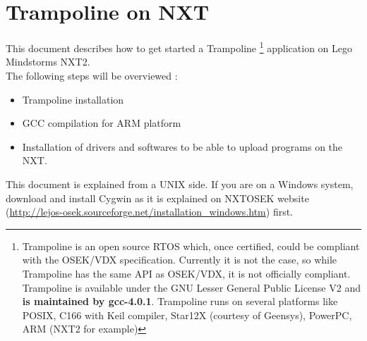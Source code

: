 


%
%



\chapter{Trampoline on NXT}

This document describes how to get started a Trampoline \footnote{Trampoline is an open source RTOS which, once certified, could be compliant with the OSEK/VDX specification. Currently it is not the case, so while Trampoline has the same API as OSEK/VDX, it is not officially compliant. Trampoline is available under the GNU Lesser General Public License V2 and \textbf{is maintained by gcc-4.0.1}. Trampoline runs on several platforms like POSIX, C166 with Keil compiler, Star12X (courtesy of Geensys), PowerPC, ARM (NXT2 for example)} application on Lego Mindstorms NXT2.\\
The following steps will be overviewed :
\begin{itemize}
\item Trampoline installation
\item GCC compilation for ARM platform
\item Installation of drivers and softwares to be able to upload programs on the NXT.
\end{itemize}
This document is explained from a UNIX side. If you are on a Windows system, download and install Cygwin as it is explained on NXTOSEK website (\href{http://lejos-osek.sourceforge.net/installation_windows.htm}{http://lejos-osek.sourceforge.net/installation\_windows.htm}) first.

